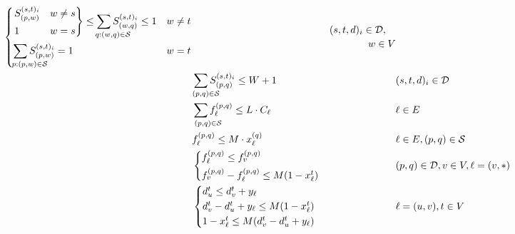\documentclass[a4paper,USenglish]{article}
\begin{document}
\begin{align}
\begin{dcases}
\begin{drcases}
		S^{(s,t)_i}_{(p,w)}	 & w \neq s\\
 1	& w=s 
\end{drcases}
	\leq \sum_{\hspace{-4ex}\mathrlap{ q:(w,q) \in \mathcal{S}}}
S^{(s,t)_i}_{(w,q) }	\leq 1	& w \neq t	\\
\sum_{\hspace{-4ex}\mathrlap{ p:(p,w) \in \mathcal{S}}}
S^{(s,t)_i}_{(p,w)}	= 1	& w=t
\end{dcases}
&&
\begin{multlined}
	(s,t,d)_i \in \mathcal{D}, \\
	w \in V
\end{multlined} \label{LP:segmentDegree}
\\
&\sum_{\hspace{-4ex}\mathrlap{(p,q) \in \mathcal{S}}} S^{(s,t)_i}_{(p,q)}  \leq W+1
&&  (s,t,d)_i \in \mathcal{D}
\label{LP:wp_limit} 
\\
& \sum_{\hspace{-3ex}\mathrlap{(p,q) \in \mathcal{S}}} f^{(p,q)}_{\ell} \leq L \cdot C_{\ell}
&&  \ell \in E
\\
&   f^{(p,q)}_{\ell} \leq M \cdot x^{(q)}_{\ell}
&&  \ell \in E, (p,q) \in \mathcal{S}
\label{LP:SPTree} 
\\
&
\begin{cases*}
f^{(p,q)}_{\ell} \leq f^{(p,q)}_{v}	\\
f^{(p,q)}_{v} - f^{(p,q)}_{\ell} \leq M(1 - x^{t}_{\ell}) 
\end{cases*}	
&&  (p,q) \in \mathcal{D},v \in V, \ell = (v,*)
\label{LP:equalSplit} 
\\ 
&\begin{cases*}
d^{t}_u \leq d^{t}_v + y_{\ell} \\
d^{t}_v - d^{t}_u + y_{\ell} \leq M(1 - x^t_{\ell})	\\
1 - x^t_{\ell} \leq M(d^{t}_v - d^{t}_u + y_{\ell})
\end{cases*}
&&  \ell = (u,v),  t \in V
\label{LP:weights}
\end{align}
\end{document}

